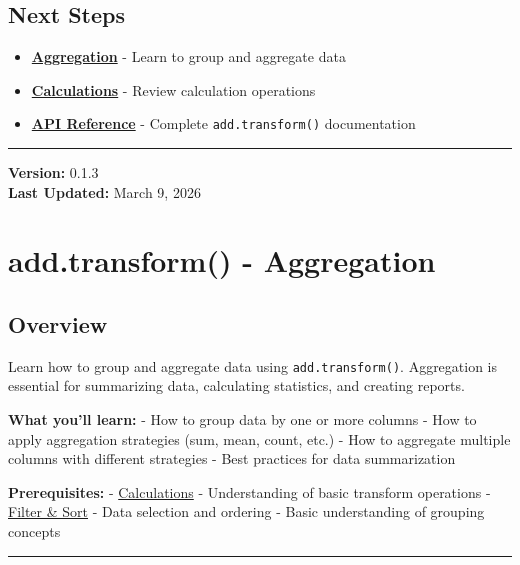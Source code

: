 \documentclass[
  letterpaper,
]{scrbook}
\providecommand{\tightlist}{%
  \setlength{\itemsep}{0pt}\setlength{\parskip}{0pt}}
\begin{document}
\section{Next Steps}\label{next-steps-8}

\begin{itemize}
\tightlist
\item
  \textbf{\href{examples-transform-03-aggregate.html}{Aggregation}} -
  Learn to group and aggregate data
\item
  \textbf{\href{examples-transform-01-calc.html}{Calculations}} - Review
  calculation operations
\item
  \textbf{\href{reference-transform.html}{API Reference}} - Complete
  \texttt{add.transform()} documentation
\end{itemize}

\begin{center}\rule{0.5\linewidth}{0.5pt}\end{center}

\textbf{Version:} 0.1.3\\
\textbf{Last Updated:} March 9, 2026

\chapter{add.transform() -
Aggregation}\label{add.transform---aggregation}

\section{Overview}\label{overview-7}

Learn how to group and aggregate data using \texttt{add.transform()}.
Aggregation is essential for summarizing data, calculating statistics,
and creating reports.

\textbf{What you'll learn:} - How to group data by one or more columns -
How to apply aggregation strategies (sum, mean, count, etc.) - How to
aggregate multiple columns with different strategies - Best practices
for data summarization

\textbf{Prerequisites:} -
\href{examples-transform-01-calc.html}{Calculations} - Understanding of
basic transform operations -
\href{examples-transform-02-filter-sort.html}{Filter \& Sort} - Data
selection and ordering - Basic understanding of grouping concepts

\begin{center}\rule{0.5\linewidth}{0.5pt}\end{center}
\end{document}
